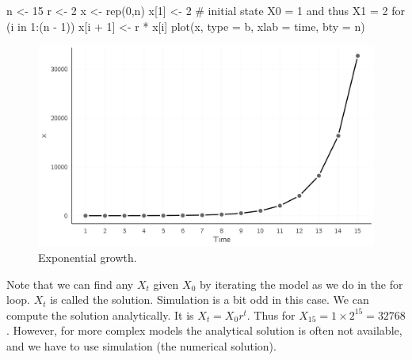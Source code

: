 \documentclass[
  a4paper,
  DIV=11,
  numbers=noendperiod]{scrreprt}
\newenvironment{Shaded}{\begin{snugshade}}{\end{snugshade}}
\newcommand{\AttributeTok}[1]{\textcolor[rgb]{0.40,0.45,0.13}{#1}}
\newcommand{\CommentTok}[1]{\textcolor[rgb]{0.37,0.37,0.37}{#1}}
\newcommand{\ControlFlowTok}[1]{\textcolor[rgb]{0.00,0.23,0.31}{#1}}
\newcommand{\DecValTok}[1]{\textcolor[rgb]{0.68,0.00,0.00}{#1}}
\newcommand{\FunctionTok}[1]{\textcolor[rgb]{0.28,0.35,0.67}{#1}}
\newcommand{\NormalTok}[1]{\textcolor[rgb]{0.00,0.23,0.31}{#1}}
\newcommand{\OtherTok}[1]{\textcolor[rgb]{0.00,0.23,0.31}{#1}}
\newcommand{\SpecialCharTok}[1]{\textcolor[rgb]{0.37,0.37,0.37}{#1}}
\newcommand{\StringTok}[1]{\textcolor[rgb]{0.13,0.47,0.30}{#1}}
\begin{document}
\begin{Shaded}
\begin{Highlighting}[]
\NormalTok{n }\OtherTok{\textless{}{-}} \DecValTok{15}
\NormalTok{r }\OtherTok{\textless{}{-}} \DecValTok{2}
\NormalTok{x }\OtherTok{\textless{}{-}} \FunctionTok{rep}\NormalTok{(}\DecValTok{0}\NormalTok{,n)}
\NormalTok{x[}\DecValTok{1}\NormalTok{] }\OtherTok{\textless{}{-}} \DecValTok{2} \CommentTok{\# initial state X0 = 1 and thus X1 = 2}
\ControlFlowTok{for}\NormalTok{ (i }\ControlFlowTok{in} \DecValTok{1}\SpecialCharTok{:}\NormalTok{(n }\SpecialCharTok{{-}} \DecValTok{1}\NormalTok{))}
\NormalTok{  x[i }\SpecialCharTok{+} \DecValTok{1}\NormalTok{] }\OtherTok{\textless{}{-}}\NormalTok{ r }\SpecialCharTok{*}\NormalTok{ x[i]}
\FunctionTok{plot}\NormalTok{(x, }\AttributeTok{type =} \StringTok{\textquotesingle{}b\textquotesingle{}}\NormalTok{, }\AttributeTok{xlab =} \StringTok{\textquotesingle{}time\textquotesingle{}}\NormalTok{, }\AttributeTok{bty =} \StringTok{\textquotesingle{}n\textquotesingle{}}\NormalTok{)}
\end{Highlighting}
\end{Shaded}

\begin{figure}

{\centering \includegraphics{media/ch2/fig-ch2-img1.jpg}

}

\caption{\label{fig-ch2-img1}Exponential growth.}

\end{figure}

Note that we can find any \(X_{t}\) given \(X_{0}\) by iterating the
model as we do in the for loop. \(X_{t}\) is called the solution.
Simulation is a bit odd in this case. We can compute the solution
analytically. It is \(X_{t} = X_{0}r^{t}\). Thus for
\(X_{15} = 1 \times 2^{15} = 32768\). However, for more complex models
the analytical solution is often not available, and we have to use
simulation (the numerical solution).
\end{document}
